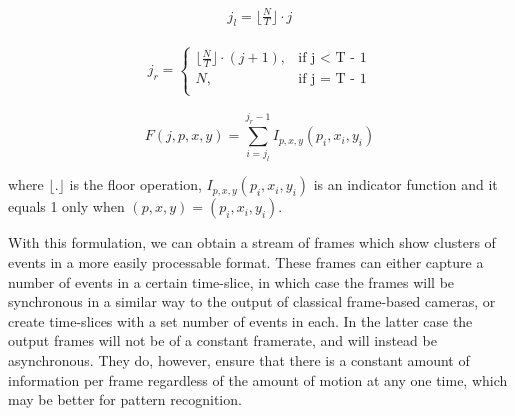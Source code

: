 \begin{align*}
      j_l = \lfloor \frac{N}{T} \rfloor \cdot j
\end{align*}
 
\begin{align*}
      j_r = \begin{cases}
            \lfloor \frac{N}{T} \rfloor \cdot (j + 1), & \text{if j < T - 1}\\
            N, & \text{if j = T - 1}\\
          \end{cases}
\end{align*}

\begin{equation}
      F(j, p, x, y) = \sum^{j_r -1}_{i=j_l}I_{p, x, y}(p_i, x_i, y_i)
      \label{eq:event_integration}
\end{equation}
 
where $ \lfloor . \rfloor $ is the floor operation, $ I_{p, x, y}(p_i, x_i, y_i) $ is an indicator function and it equals 1 only when $ (p, x, y) = (p_i, x_i, y_i) $.

With this formulation, we can obtain a stream of frames which show clusters of events in a more easily processable format. These frames can either capture a number of events in a certain time-slice, in which case the frames will be synchronous in a similar way to the output of classical frame-based cameras, or create time-slices with a set number of events in each. In the latter case the output frames will not be of a constant framerate, and will instead be asynchronous. They do, however, ensure that there is a constant amount of information per frame regardless of the amount of motion at any one time, which may be better for pattern recognition.




